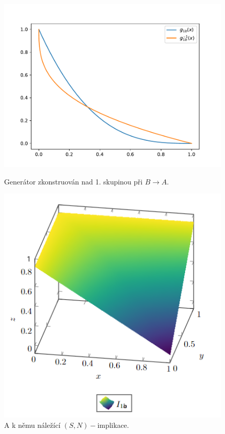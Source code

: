 \begin{figure}[H]
              \centering
              \begin{minipage}[b]{0.45\textwidth}
                \includegraphics[width=\textwidth]{template-fig/p1.pdf}
                \caption{Generátor zkonstruován nad 1. skupinou při $B \to A.$ }
              \end{minipage}
              \hfill
              \begin{minipage}[b]{0.4\textwidth}
                \includegraphics[width=\textwidth]{template-fig/i1.png}
                \caption{A k němu náležící $(S,N)-$implikace.}
              \end{minipage}
            \end{figure}




